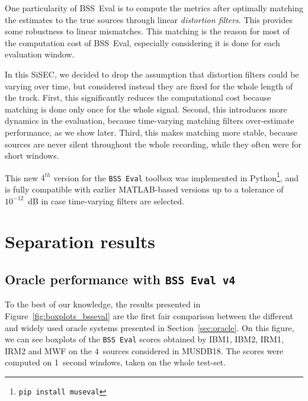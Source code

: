 \documentclass{article}
\begin{document}
One particularity of BSS~Eval is to compute the metrics after optimally matching the estimates to the true sources through linear \textit{distortion filters}. This provides some robustness to linear mismatches. This matching is the reason for most of the computation cost of BSS~Eval, especially considering it is done for each evaluation window.

In this SiSEC, we decided to drop the assumption that distortion filters could be varying over time, but considered instead they are fixed for the whole length of the track. First, this significantly reduces the computational cost because matching is done only once for the whole signal. Second, this introduces more dynamics in the evaluation, because time-varying matching filters over-estimate performance, as we show later. Third, this makes matching more stable, because sources are never silent throughout the whole recording, while they often were for short windows.

This new $4^{th}$ version for the \texttt{BSS~Eval} toolbox was implemented in Python\footnote{\texttt{pip install museval}}, and is fully compatible with earlier MATLAB-based versions up to a tolerance of $10^{-12}$~dB in case time-varying filters are selected.

\section{Separation results}
\subsection{Oracle performance with \texttt{BSS Eval v4}}
\label{ssec:bsseval-results}

To the best of our knowledge, the results presented in Figure~\ref{fig:boxplots_bsseval} are the first fair comparison between the different and widely used oracle systems presented in Section~\ref{sec:oracle}. On this figure, we can see boxplots of the \texttt{BSS~Eval} scores obtained by IBM1, IBM2, IRM1, IRM2 and MWF on the $4$~sources considered in MUSDB18. The scores were computed on 1~second windows, taken on the whole test-set.
\end{document}
